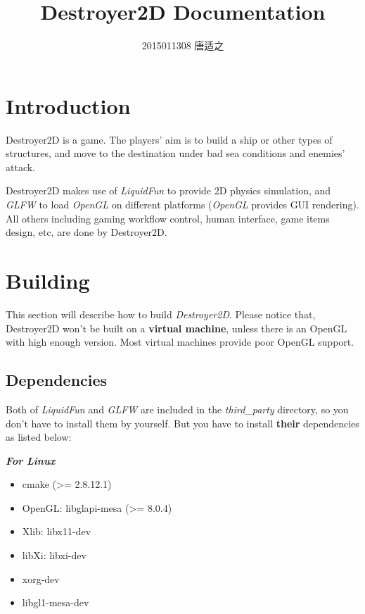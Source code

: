 \documentclass[UTF8]{ctexart}
\title{\huge Destroyer2D Documentation}
\author{\large 2015011308 唐适之}
\date{}
\begin{document}
    
    \maketitle

    \tableofcontents

    \section{Introduction}

        Destroyer2D is a game. The players' aim is to build a ship or other types of structures, and move to the destination under bad sea conditions and enemies' attack.

        Destroyer2D makes use of \textit{LiquidFun} to provide 2D physics simulation, and \textit{GLFW} to load \textit{OpenGL} on different platforms (\textit{OpenGL} provides GUI rendering). All others including gaming workflow control, human interface, game items design, etc, are done by Destroyer2D.

    \section{Building}

        This section will describe how to build \textit{Destroyer2D}. Please notice that, Destroyer2D won't be built on a \textbf{virtual machine}, unless there is an OpenGL with high enough version. Most virtual machines provide poor OpenGL support.

        \subsection{Dependencies}

            Both of \textit{LiquidFun} and \textit{GLFW} are included in the \textit{third\_party} directory, so you don't have to install them by yourself. But you have to install \textbf{their} dependencies as listed below:

            \noindent \textbf{\textit{For Linux}}

            \begin{itemize}
                \item cmake (>= 2.8.12.1)
                \item OpenGL: libglapi-mesa (>= 8.0.4)
                \item Xlib: libx11-dev
                \item libXi: libxi-dev
                \item xorg-dev
                \item libgl1-mesa-dev
            \end{itemize}
\end{document}
